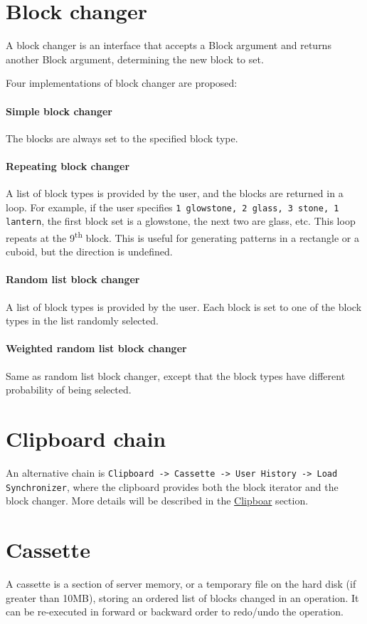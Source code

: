 \documentclass{article}
\def \sup #1{\textsuperscript{#1}}
\begin{document}
			\section{Block changer}
				A block changer is an interface that accepts a Block argument and returns another Block argument,
				determining the new block to set.

				Four implementations of block changer are proposed:
				\paragraph{Simple block changer} The blocks are always set to the specified block type.
				\paragraph{Repeating block changer} A list of block types is provided by the user, and the blocks are
				returned in a loop. For example, if the user specifies \texttt{1 glowstone, 2 glass, 3 stone, 1 lantern},
				the first block set is a glowstone, the next two are glass, etc. This loop repeats at the 9\sup{th}
				block. This is useful for generating patterns in a rectangle or a cuboid, but the direction is undefined.
				\paragraph{Random list block changer} A list of block types is provided by the user. Each block is set
				to one of the block types in the list randomly selected.
				\paragraph{Weighted random list block changer} Same as random list block changer, except that the block
				types have different probability of being selected.

			\section{Clipboard chain}
				An alternative chain is \texttt{Clipboard -> Cassette -> User History -> Load Synchronizer}, where the
				clipboard provides both the block iterator and the block changer. More details will be described in the
				\hyperref[sec:clipboard]{Clipboar} section.

			\section{Cassette}
				A cassette is a section of server memory, or a temporary file on the hard disk (if greater than 10MB),
				storing an ordered list of blocks changed in an operation. It can be re-executed in forward or backward
				order to redo/undo the operation.
\end{document}
